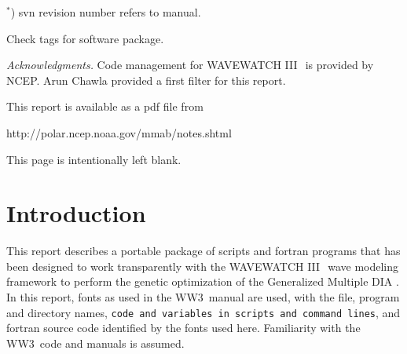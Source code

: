 \documentclass[12pt]{article}
\newcommand{\pstyle}{myheadings}
\newcommand{\wwt}{WAVEWATCH III$\:$\textsuperscript\textregistered}
\newcommand{\ws}{WW3}
\newcommand{\gmd}{GMD}
\newcommand{\file}{\sf}
\newcommand{\code}{\tt}
\newcommand{\F}{\sc}
\newcommand{\pb}{\strut \vfill \pagebreak}
\newcommand{\bpagea}{\strut

\vspace{2.5in} \centerline{This page is intentionally left blank.}}
\newcommand{\newsec}{\setcounter{equation}{0}
                      \setcounter{myfigno}{0}
                      \setcounter{mytabno}{0}}
\newcounter{myfigno}[section]
\newcounter{mytabno}[section]
\begin{document}
\hspace{55mm} $^*$) svn revision number refers to manual.

\hspace{59mm}  Check tags for software package.

\vfill \pagebreak



{\it Acknowledgments.} Code management for \wwt\ is provided by NCEP. Arun
Chawla provided a first filter for this report.

\vspace{\baselineskip} \noindent
This report is available as a pdf file from

\vspace{\baselineskip}
\centerline{http://polar.ncep.noaa.gov/mmab/notes.shtml}


\vfill \pagebreak

\tableofcontents

\pb
\pagestyle{empty}

\bpagea


\pb
\pagestyle{\pstyle}
\section{Introduction} \label{sec:intro}
\newsec

\noindent
This report describes a portable package of scripts and {\F fortran} programs
that has been designed to work transparently with the \wwt\ wave modeling
framework \citep[model henceforth denoted as \ws]{tol:MMAB09a} to perform the
genetic optimization \citep[e.g.,][]{bk:ES03} of the Generalized Multiple DIA
\citep[\gmd,][]{tol:MMAB10d, tol:OMODgmd1, tol:OMODgmd2}.  In this report,
fonts as used in the \ws\ manual are used, with the {\file file, program and
directory names}, {\code code and variables in scripts and command lines}, and
{\F fortran} source code identified by the fonts used here. Familiarity with
the \ws\ code and manuals is assumed.
\end{document}
